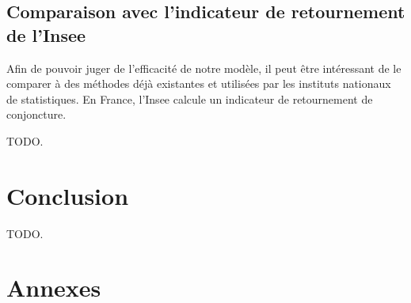 \documentclass[10pt,french,french]{article}
\begin{document}
\hypertarget{comparaison-avec-lindicateur-de-retournement-de-linsee}{%
\subsection{Comparaison avec l'indicateur de retournement de l'Insee}\label{comparaison-avec-lindicateur-de-retournement-de-linsee}}

Afin de pouvoir juger de l'efficacité de notre modèle, il peut être intéressant de le comparer à des méthodes déjà existantes et utilisées par les instituts nationaux de statistiques. En France, l'Insee calcule un indicateur de retournement de conjoncture.

TODO.

\hypertarget{conclusion}{%
\section{Conclusion}\label{conclusion}}

TODO.

\newpage

\hypertarget{annexes}{%
\section{Annexes}\label{annexes}}
\end{document}
